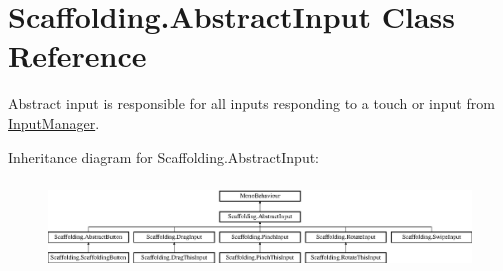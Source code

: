 \hypertarget{class_scaffolding_1_1_abstract_input}{\section{Scaffolding.\+Abstract\+Input Class Reference}
\label{class_scaffolding_1_1_abstract_input}
}


Abstract input is responsible for all inputs responding to a touch or input from \hyperlink{class_scaffolding_1_1_input_manager}{Input\+Manager}.  


Inheritance diagram for Scaffolding.\+Abstract\+Input\+:\begin{figure}[H]
\begin{center}
\leavevmode
\includegraphics[height=2.395722cm]{class_scaffolding_1_1_abstract_input}
\end{center}
\end{figure}
